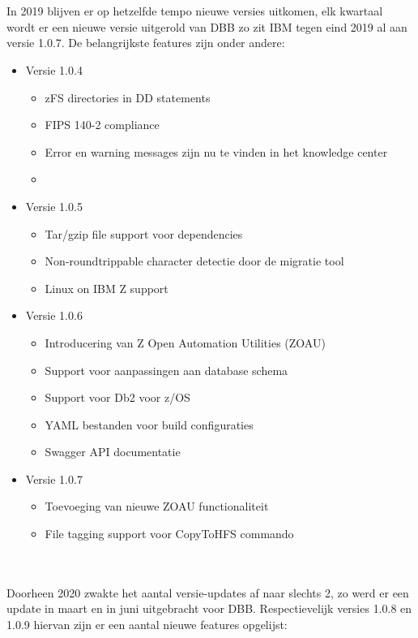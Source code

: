 \\ \\
In 2019 blijven er op hetzelfde tempo nieuwe versies uitkomen, elk kwartaal wordt er een nieuwe versie uitgerold van DBB zo zit IBM tegen eind 2019 al aan versie 1.0.7.
De belangrijkste features zijn onder andere:
\begin{itemize}
    \item Versie 1.0.4
    \begin{itemize}
        \item zFS directories in DD statements
        \item FIPS 140-2 compliance
        \item Error en warning messages zijn nu te vinden in het knowledge center
        \item
    \end{itemize}
    \item Versie 1.0.5
    \begin{itemize}
        \item Tar/gzip file support voor dependencies
        \item Non-roundtrippable character detectie door de migratie tool
        \item Linux on IBM Z support
    \end{itemize}
    \item Versie 1.0.6
    \begin{itemize}
        \item Introducering van Z Open Automation Utilities (ZOAU)
        \item Support voor aanpassingen aan database schema
        \item Support voor Db2 voor z/OS
        \item YAML bestanden voor build configuraties
        \item Swagger API documentatie
    \end{itemize}
    \item Versie 1.0.7
    \begin{itemize}
        \item Toevoeging van nieuwe ZOAU functionaliteit
        \item File tagging support voor CopyToHFS commando
    \end{itemize}
\end{itemize}
\\ \\
Doorheen 2020 zwakte het aantal versie-updates af naar slechts 2, zo werd er een update in maart en in juni uitgebracht voor DBB. Respectievelijk versies 1.0.8 en 1.0.9 hiervan zijn er een aantal nieuwe features opgelijst:
